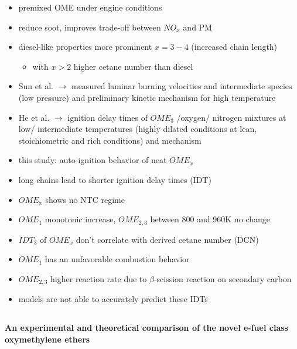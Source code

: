 \documentclass[12pt,oneside,a4paper,english]{article}
\begin{document}
\begin{itemize}
\item{premixed OME under engine conditions}
\item{reduce soot, improves trade-off between $NO_x$ and PM}
\item{diesel-like properties more prominent $x=3-4$ (increased chain length)}

		\begin{itemize}
		\item{with $x>2$ higher cetane number than diesel}
		\end{itemize}

\item{Sun et al. $\rightarrow$ measured laminar burning velocities and intermediate species (low pressure) and preliminary kinetic mechanism for high temperature}
\item{He et al. $\rightarrow$ ignition delay times of $OME_3$ /oxygen/ nitrogen mixtures at low/ intermediate temperatures (highly dilated conditions at lean, stoichiometric and rich conditions) and mechanism}
\item{this study: auto-ignition behavior of neat $OME_x$}
\item{long chains lead to shorter ignition delay times (IDT)}
\item{$OME_x$ shows no NTC regime}
\item{$OME_1$ monotonic increase, $OME_{2,3}$ between 800 and 960K no change}
\item{$IDT_3$ of $OME_x$ don't correlate with derived cetane number (DCN)}
\item{$OME_1$ has an unfavorable combustion behavior}
\item{$OME_{2,3}$ higher reaction rate due to $\beta$-scission reaction on secondary carbon}
\item{models are not able to accurately predict these IDTs} \\
\end{itemize}


\subsection{\cite{Cai2019}} %
\textbf{An experimental and theoretical comparison of the novel e-fuel class oxymethylene ethers}
\end{document}

